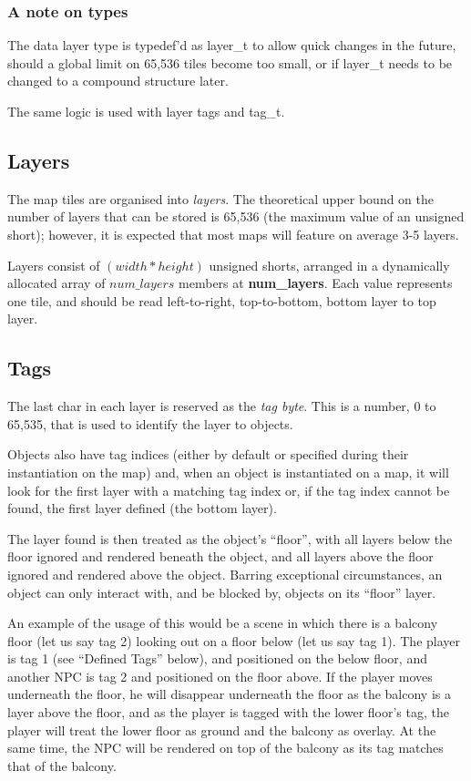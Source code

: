 \documentclass [12pt,a4paper]{article}
\begin{document}
\subsubsection{A note on types}

The data layer type is typedef'd as layer\_t to allow quick changes in
the future, should a global limit on 65,536 tiles become too small, or
if layer\_t needs to be changed to a compound structure later.

The same logic is used with layer tags and tag\_t.

\subsection{Layers}

The map tiles are organised into \emph{layers}.  The theoretical upper
bound on the number of layers that can be stored is 65,536 (the maximum
value of an unsigned short); however, it is expected that most maps
will feature on average 3-5 layers.

Layers consist of $(width * height)$ unsigned shorts, arranged in a
dynamically allocated array of $num\_layers$ members at
\textbf{num\_layers}.  Each value represents one tile, and should be
read left-to-right, top-to-bottom, bottom layer to top layer.

\subsection{Tags}

The last char in each layer is reserved as the \emph{tag byte}.  This
is a number, 0 to 65,535, that is used to identify the layer to
objects.

Objects also have tag indices (either by default or specified during
their instantiation on the map) and, when an object is instantiated on
a map, it will look for the first layer with a matching tag index or,
if the tag index cannot be found, the first layer defined (the bottom
layer).

The layer found is then treated as the object's ``floor'', with all
layers below the floor ignored and rendered beneath the object, and
all layers above the floor ignored and rendered above the object.
Barring exceptional circumstances, an object can only interact with,
and be blocked by, objects on its ``floor'' layer.

An example of the usage of this would be a scene in which there is a
balcony floor (let us say tag 2) looking out on a floor below (let us
say tag 1).  The player is tag 1 (see ``Defined Tags'' below), and
positioned on the below floor, and another NPC is tag 2 and positioned
on the floor above.  If the player moves underneath the floor, he will
disappear underneath the floor as the balcony is a layer above the
floor, and as the player is tagged with the lower floor's tag, the
player will treat the lower floor as ground and the balcony as
overlay.  At the same time, the NPC will be rendered on top of the
balcony as its tag matches that of the balcony.
\end{document}
